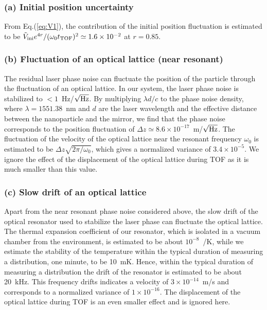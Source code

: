 \documentclass[aps, prl, 
amsmath, showpacs, preprintnumbers, twocolumn, amssymb, amsmath, superscriptaddress]{revtex4-1}
\begin{document}
\subsubsection*{(a) Initial position uncertainty}
From Eq.(\ref{eq:V1}), the contribution of the initial position fluctuation is estimated to be $\tilde{V}_{\rm ini} e^{4r}/(\omega_0  t_{\rm TOF})^2 \simeq 1.6 \times 10^{-2}$ at $r=0.85$.

\subsubsection*{(b) Fluctuation of an optical lattice (near resonant)}
The residual laser phase noise can fluctuate the position of the particle through the fluctuation of an optical lattice. In our system, the laser phase noise is stabilized to $<1$~Hz/$\sqrt{\rm Hz}$. By multiplying $\lambda d/c$ to the phase noise density, where $\lambda = 1551.38$~nm and $d$ are the laser wavelength and the effective distance between the nanoparticle and the mirror, we find that the phase noise corresponds to the position fluctuation of $\Delta z \simeq 8.6 \times 10^{-17}$~m/$\sqrt{\rm Hz}$. The fluctuation of the velocity of the optical lattice near the resonant frequency $\omega_0$ is estimated to be $\Delta z \sqrt{2\pi/\omega_0}$, which gives a normalized variance of $3.4 \times 10^{-5}$. We ignore the effect of the displacement of the optical lattice during TOF as it is much smaller than this value.

\subsubsection*{(c) Slow drift of an optical lattice}
Apart from the near resonant phase noise considered above, the slow drift of the optical resonator used to stabilize the laser phase can fluctuate the optical lattice. The thermal expansion coefficient of our resonator, which is isolated in a vacuum chamber from the environment, is estimated to be about $10^{-8}$~/K, while we estimate the stability of the temperature within the typical duration of measuring a distribution, one minute, to be 10~mK. Hence, within the typical duration of measuring a distribution the drift of the resonator is estimated to be about 20~kHz. This frequency drifts indicates a velocity of $3 \times 10^{-14}$~m/s and corresponds to a normalized variance of $1 \times 10^{-16}$. The displacement of the optical lattice during TOF is an even smaller effect and is ignored here.
\end{document}
